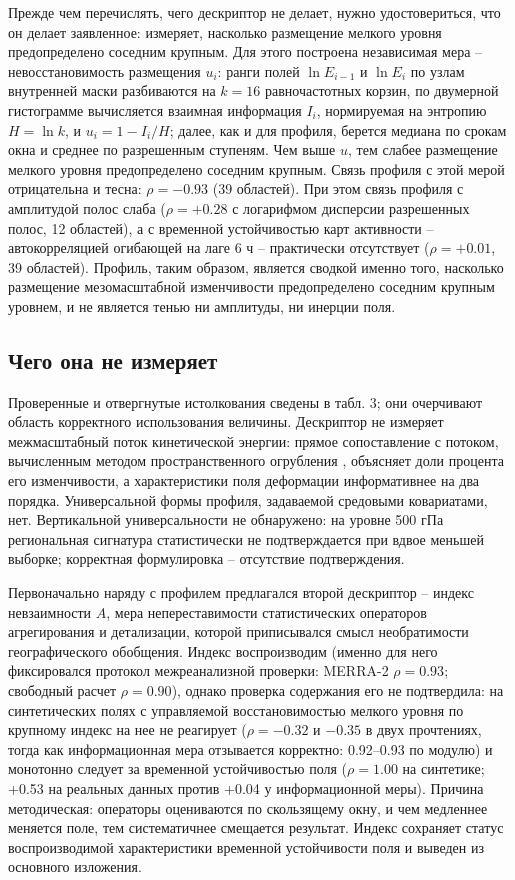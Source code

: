 \documentclass[12pt,a4paper]{article}
\begin{document}
Прежде чем перечислять, чего дескриптор не делает, нужно удостовериться, что он делает заявленное: измеряет, насколько размещение мелкого уровня предопределено соседним крупным. Для этого построена независимая мера -- невосстановимость размещения $u_i$: ранги полей $\ln E_{i-1}$ и $\ln E_i$ по узлам внутренней маски разбиваются на $k = 16$ равночастотных корзин, по двумерной гистограмме вычисляется взаимная информация $I_i$, нормируемая на энтропию $H = \ln k$, и $u_i = 1 - I_i/H$; далее, как и для профиля, берется медиана по срокам окна и среднее по разрешенным ступеням. Чем выше $u$, тем слабее размещение мелкого уровня предопределено соседним крупным. Связь профиля с этой мерой отрицательна и тесна: $\rho = -0.93$ (39 областей). При этом связь профиля с амплитудой полос слаба ($\rho = +0.28$ с логарифмом дисперсии разрешенных полос, 12 областей), а с временной устойчивостью карт активности -- автокорреляцией огибающей на лаге 6 ч -- практически отсутствует ($\rho = +0.01$, 39 областей). Профиль, таким образом, является сводкой именно того, насколько размещение мезомасштабной изменчивости предопределено соседним крупным уровнем, и не является тенью ни амплитуды, ни инерции поля.

\subsection{Чего она не измеряет}

Проверенные и отвергнутые истолкования сведены в табл. 3; они очерчивают область корректного использования величины. Дескриптор не измеряет межмасштабный поток кинетической энергии: прямое сопоставление с потоком, вычисленным методом пространственного огрубления \cite{Germano1992,Aluie2018}, объясняет доли процента его изменчивости, а характеристики поля деформации информативнее на два порядка. Универсальной формы профиля, задаваемой средовыми ковариатами, нет. Вертикальной универсальности не обнаружено: на уровне 500 гПа региональная сигнатура статистически не подтверждается при вдвое меньшей выборке; корректная формулировка -- отсутствие подтверждения.

Первоначально наряду с профилем предлагался второй дескриптор -- индекс невзаимности $A$, мера непереставимости статистических операторов агрегирования и детализации, которой приписывался смысл необратимости географического обобщения. Индекс воспроизводим (именно для него фиксировался протокол межреанализной проверки: MERRA-2 $\rho = 0.93$; свободный расчет $\rho = 0.90$), однако проверка содержания его не подтвердила: на синтетических полях с управляемой восстановимостью мелкого уровня по крупному индекс на нее не реагирует ($\rho = -0.32$ и $-0.35$ в двух прочтениях, тогда как информационная мера отзывается корректно: 0.92--0.93 по модулю) и монотонно следует за временной устойчивостью поля ($\rho = 1.00$ на синтетике; +0.53 на реальных данных против +0.04 у информационной меры). Причина методическая: операторы оцениваются по скользящему окну, и чем медленнее меняется поле, тем систематичнее смещается результат. Индекс сохраняет статус воспроизводимой характеристики временной устойчивости поля и выведен из основного изложения.
\end{document}
